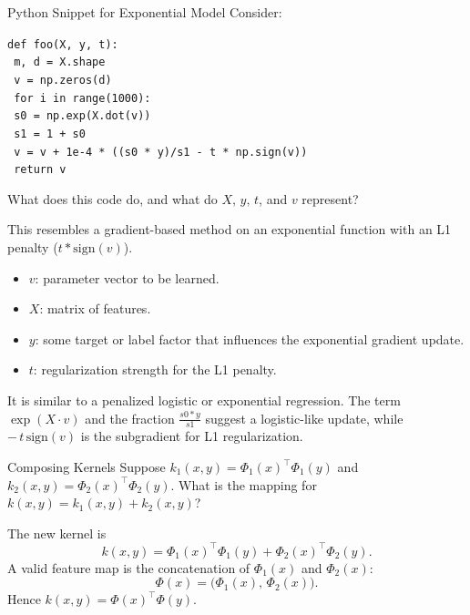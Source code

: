 \documentclass{article}
\begin{document}
\begin{exercise}{Python Snippet for Exponential Model}
  Consider:

  \medskip
  \texttt{def foo(X, y, t):}\\
  \texttt{    m, d = X.shape}\\
  \texttt{    v = np.zeros(d)}\\
  \texttt{    for i in range(1000):}\\
  \texttt{        s0 = np.exp(X.dot(v))}\\
  \texttt{        s1 = 1 + s0}\\
  \texttt{        v = v + 1e-4 * ((s0 * y)/s1 - t * np.sign(v))}\\
  \texttt{    return v}

  What does this code do, and what do $X,\,y,\,t$, and $v$ represent?

  \begin{solution}
    This resembles a gradient-based method on an exponential function with an L1 penalty ($t * \text{sign}(v)$).  
    \begin{itemize}
      \item $v$: parameter vector to be learned.
      \item $X$: matrix of features.
      \item $y$: some target or label factor that influences the exponential gradient update.
      \item $t$: regularization strength for the L1 penalty.
    \end{itemize}
    It is similar to a penalized logistic or exponential regression. The term $\exp(X\cdot v)$ and the fraction $\frac{s0 * y}{s1}$ suggest a logistic-like update, while $-\,t\,\mathrm{sign}(v)$ is the subgradient for L1 regularization.
  \end{solution}
\end{exercise}

\begin{exercise}{Composing Kernels}
  Suppose $k_1(x,y) = \Phi_1(x)^\top \Phi_1(y)$ and $k_2(x,y) = \Phi_2(x)^\top \Phi_2(y)$. What is the mapping for $k(x,y) = k_1(x,y) + k_2(x,y)$?

  \begin{solution}
    The new kernel is 
    \[
      k(x,y) = \Phi_1(x)^\top \Phi_1(y) + \Phi_2(x)^\top \Phi_2(y).
    \]
    A valid feature map is the concatenation of $\Phi_1(x)$ and $\Phi_2(x)$:
    \[
      \Phi(x) = \bigl(\Phi_1(x),\,\Phi_2(x)\bigr).
    \]
    Hence $k(x,y) = \Phi(x)^\top \Phi(y)$.
  \end{solution}
\end{exercise}
\end{document}
